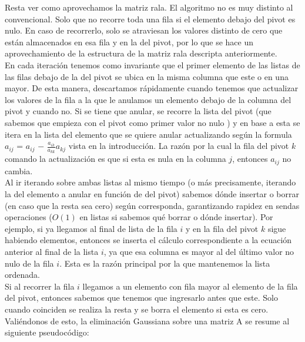 Resta ver como aprovechamos la matriz rala. El algoritmo no es muy distinto al convencional. Solo que no recorre toda una fila si el elemento debajo del pivot es nulo. En caso de recorrerlo, solo se atraviesan los valores distinto de cero que están almacenados en esa fila y en la del pivot, por lo que se hace un aprovechamiento de la estructura de la matriz rala descripta anteriormente.\\

En cada iteración tenemos como invariante que el primer elemento de las listas de las filas debajo de la del pivot se ubica en la misma columna que este o en una mayor. De esta manera, descartamos rápidamente cuando tenemos que actualizar los valores de la fila a la que le anulamos un elemento debajo de la columna del pivot y cuando no.
Si se tiene que anular, se recorre la lista del pivot (que sabemos que empieza con el pivot como primer valor no nulo ) y en base a esta se itera en la lista del elemento que se quiere anular actualizando según la formula $a_{ij}$ = $a_{ij}$ $-$ $\frac{a_{ik}}{a_{kk}} a_{kj}$ vista en la introducción. La razón por la cual la fila del pivot $k$ comando la actualización es que si esta es nula en la columna $j$, entonces $a_{ij}$ no cambia. \\

Al ir iterando sobre ambas listas al mismo tiempo (o más precisamente, iterando la del elemento a anular en función de del pivot) sabemos dónde insertar o borrar (en caso que la resta sea cero) según corresponda, garantizando rapidez en sendas operaciones ($O(1)$ en listas si sabemos qué borrar o dónde insertar). 
Por ejemplo, si ya llegamos al final de lista de la fila $i$ y en la fila del pivot $k$ sigue habiendo elementos, entonces se inserta el cálculo correspondiente a la ecuación anterior al final de la lista $i$, ya que esa columna es mayor al del último valor no nulo de la fila $i$. Esta es la razón principal por la que mantenemos la lista ordenada.\\

Si al recorrer la fila $i$ llegamos a un elemento con fila mayor al elemento de la fila del pivot, entonces sabemos que tenemos que ingresarlo antes que este. Solo cuando coinciden se realiza la resta y se borra el elemento si esta es cero. \\

Valiéndonos de esto, la eliminación Gaussiana sobre una matriz A se resume al siguiente pseudocódigo: \\

